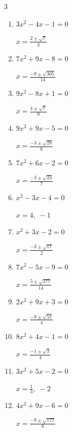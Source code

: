 \begin{multicols}{3}
\begin{enumerate}
        $\displaystyle x=\frac{-7\pm \sqrt{109}}{10}$

  \item $3x^{2}-4x-1=0$

        $\displaystyle x=\frac{2\pm \sqrt{7}}{3}$

  \item $7x^{2}+9x-8=0$

        $\displaystyle x=\frac{-9\pm \sqrt{305}}{14}$

  \item $9x^{2}-8x+1=0$

        $\displaystyle x=\frac{4\pm \sqrt{7}}{9}$

\columnbreak %

  \item $9x^{2}+9x-5=0$

        $\displaystyle x=\frac{-3\pm \sqrt{29}}{6}$

  \item $7x^{2}+6x-2=0$

        $\displaystyle x=\frac{-3\pm \sqrt{23}}{7}$

  \item $x^{2}-3x-4=0$

        $\displaystyle x=4, \; -1$

  \item $x^{2}+3x-2=0$

        $\displaystyle x=\frac{-3\pm \sqrt{17}}{2}$

  \item $7x^{2}-5x-9=0$

        $\displaystyle x=\frac{5\pm \sqrt{277}}{14}$

  \item $2x^{2}+9x+3=0$

        $\displaystyle x=\frac{-9\pm \sqrt{57}}{4}$

  \item $8x^{2}+4x-1=0$

        $\displaystyle x=\frac{-1\pm \sqrt{3}}{4}$

\columnbreak %

\resetques

  \item $3x^{2}+5x-2=0$

        $\displaystyle x=\frac{1}{3}, \; -2$

  \item $4x^{2}+9x-6=0$

        $\displaystyle x=\frac{-9\pm \sqrt{177}}{8}$


\end{enumerate}
\end{multicols}
